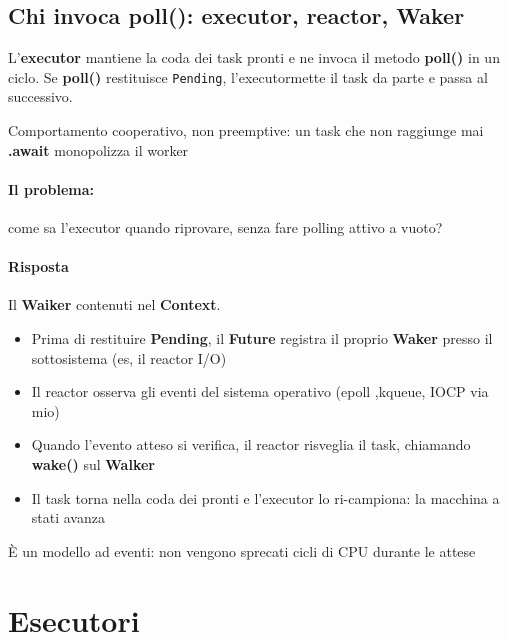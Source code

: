 \subsection{Chi invoca poll(): executor, reactor, Waker}

L'\textbf{executor} mantiene la coda dei task pronti e ne invoca il metodo \textbf{poll()} in un ciclo.
Se \textbf{poll()} restituisce \verb|Pending|, l'executormette il task da parte e passa al successivo.

Comportamento cooperativo, non preemptive: un task che non raggiunge mai \textbf{.await} monopolizza
il worker

\paragraph{Il problema:} come sa l'executor quando riprovare, senza fare polling attivo a vuoto?


\paragraph{Risposta}
Il \textbf{Waiker} contenuti nel \textbf{Context}.

\begin{itemize}
  \item Prima di restituire \textbf{Pending}, il \textbf{Future} registra il proprio \textbf{Waker} presso il sottosistema (es, il reactor
        I/O)
  \item Il reactor osserva gli eventi del sistema operativo (epoll ,kqueue, IOCP via mio)
  \item Quando l'evento atteso si verifica, il reactor risveglia il task, chiamando \textbf{wake()} sul \textbf{Walker}
  \item Il task torna nella coda dei pronti e l'executor lo ri-campiona: la macchina a stati avanza
\end{itemize}

È un modello ad eventi: non vengono sprecati cicli di CPU durante le attese








\section{Esecutori}


